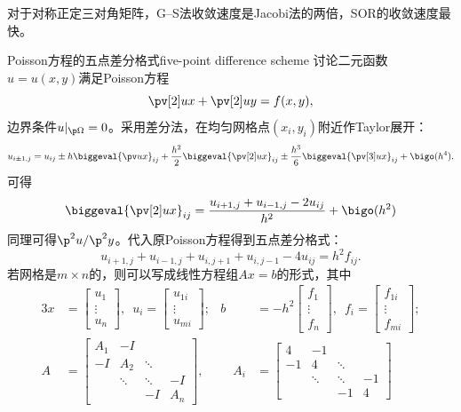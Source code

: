 \begin{remark}
    对于对称正定三对角矩阵，G--S法收敛速度是Jacobi法的两倍，SOR的收敛速度最快。
\end{remark}

\begin{example}
    {Poisson方程的五点差分格式}{five-point difference scheme}
    讨论二元函数$u=u(x,y)$满足Poisson方程
    \[
        \pv[2]ux+\pv[2]uy=f(x,y),
    \]
    边界条件$u|_{\p\Omega}=0$。采用差分法，在均匀网格点$(x_i,y_i)$附近作Taylor展开：
    \[
        u_{i\pm 1,j}=u_{ij}\pm h\biggeval{\pv ux}_{ij}+\frac{h^2}2\biggeval{\pv[2]ux}_{ij}\pm\frac{h^3}6\biggeval{\pv[3]ux}_{ij}+\bigo(h^4).
    \]
    可得
    \[
        \biggeval{\pv[2]ux}_{ij}=\frac{u_{i+1,j}+u_{i-1,j}-2u_{ij}}{h^2}+\bigo(h^2)
    \]
    同理可得$\p^2u/\p^2y$。代入原Poisson方程得到五点差分格式：
    \begin{equation}
        u_{i+1,j}+u_{i-1,j}+u_{i,j+1}+u_{i,j-1}-4u_{ij}=h^2f_{ij}.
    \end{equation}
    若网格是$m\times n$的，则可以写成线性方程组$Ax=b$的形式，其中        
    \begin{alignat*}{3}
        x&=\begin{bmatrix}
            u_1\\\vdots\\ u_n
        \end{bmatrix},\enspace u_i=\begin{bmatrix}
            u_{1i}\\\vdots\\u_{mi}
        \end{bmatrix};&
        b&=-h^2\begin{bmatrix}
            f_1\\\vdots\\f_n
        \end{bmatrix},\enspace f_i=\begin{bmatrix}
            f_{1i}\\\vdots\\f_{mi}
        \end{bmatrix};\\
        A&=\begin{bmatrix}
            A_1&-I\\-I&A_2&\ddots\\ &\ddots&\ddots&-I\\ &&-I&A_n
        \end{bmatrix},&\quad A_i&=\begin{bmatrix}
            4&-1\\-1&4&\ddots\\ &\ddots&\ddots&-1\\ &&-1&4

\end{bmatrix}
\end{alignat*}
\end{example}
